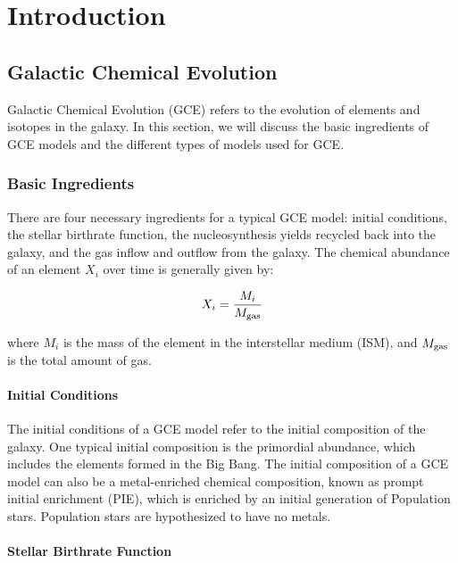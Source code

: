 \documentclass{brandeis-thesis3.2}
\begin{document}
\startbody

\chapter{Introduction}

\section{Galactic Chemical Evolution}

Galactic Chemical Evolution (GCE) refers to the evolution of elements and isotopes in the galaxy. In this section, we will discuss the basic ingredients of GCE models and the different types of models used for GCE.

\subsection{Basic Ingredients}

There are four necessary ingredients for a typical GCE model: initial conditions, the stellar birthrate function, the nucleosynthesis yields recycled back into the galaxy, and the gas inflow and outflow from the galaxy. The chemical abundance of an element $X_i$ over time is generally given by:

\begin{equation}
X_i = \frac{M_i}{M_{\rm gas}}
\end{equation}

where $M_i$ is the mass of the element in the interstellar medium (ISM), and $M_{\rm gas}$ is the total amount of gas.

\subsubsection{Initial Conditions}

The initial conditions of a GCE model refer to the initial composition of the galaxy. One typical initial composition is the primordial abundance, which includes the elements formed in the Big Bang. The initial composition of a GCE model can also be a metal-enriched chemical composition, known as prompt initial enrichment (PIE), which is enriched by an initial generation of Population  stars. Population  stars are hypothesized to have no metals.

\subsubsection{Stellar Birthrate Function}
\end{document}
